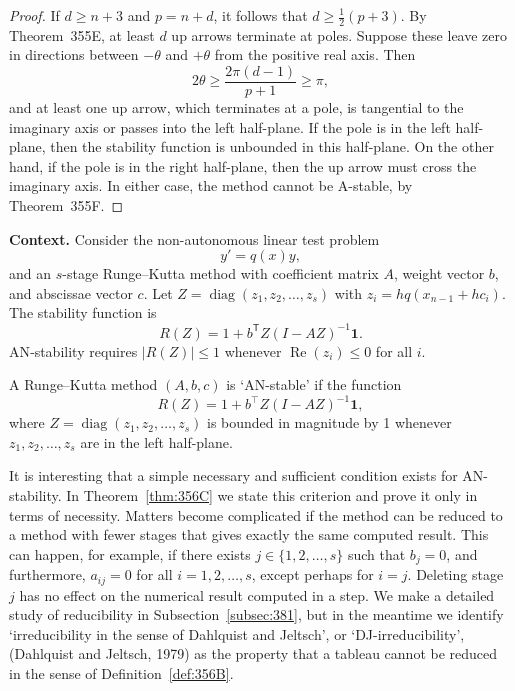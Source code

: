 \begin{proof}
If \( d \geq n + 3 \) and \( p = n + d \), it follows that \( d \geq \frac{1}{2}(p + 3) \). By Theorem~355E, at least \( d \) up arrows terminate at poles. Suppose these leave zero in directions between \( -\theta \) and \( +\theta \) from the positive real axis. Then
\[
2\theta \geq \frac{2\pi(d - 1)}{p + 1} \geq \pi,
\]
and at least one up arrow, which terminates at a pole, is tangential to the imaginary axis or passes into the left half-plane. If the pole is in the left half-plane, then the stability function is unbounded in this half-plane. On the other hand, if the pole is in the right half-plane, then the up arrow must cross the imaginary axis. In either case, the method cannot be A-stable, by Theorem~355F.
\end{proof}

\noindent\textbf{Context.}
Consider the non-autonomous linear test problem
\begin{equation}
    y' = q(x)y,
    \tag{356a}
\end{equation}
and an $s$-stage Runge--Kutta method with coefficient matrix $A$, weight vector $b$, and abscissae vector $c$.  
Let $Z = \operatorname{diag}(z_1, z_2, \dots, z_s)$ with $z_i = h q(x_{n-1} + h c_i)$.  
The stability function is
\[
R(Z) = 1 + b^{\mathsf T} Z (I - A Z)^{-1} \mathbf{1}.
\]
AN‑stability requires $|R(Z)| \le 1$ whenever $\operatorname{Re}(z_i) \le 0$ for all $i$.

\begin{definition}

  \label{def:356A}
A Runge--Kutta method $(A, b, c)$ is `AN-stable' if the function
\[
R(Z) = 1 + b^\top Z (I - AZ)^{-1} \mathbf{1},
\]
where $Z = \operatorname{diag}(z_1, z_2, \dots, z_s)$ is bounded in magnitude by 1 whenever $z_1, z_2, \dots, z_s$ are in the left half-plane.

It is interesting that a simple necessary and sufficient condition exists for AN-stability. In Theorem~\ref{thm:356C} we state this criterion and prove it only in terms of necessity. Matters become complicated if the method can be reduced to a method with fewer stages that gives exactly the same computed result. This can happen, for example, if there exists $j \in \{1, 2, \dots, s\}$ such that $b_j = 0$, and furthermore, $a_{ij} = 0$ for all $i = 1, 2, \dots, s$, except perhaps for $i = j$. Deleting stage $j$ has no effect on the numerical result computed in a step. We make a detailed study of reducibility in Subsection~\ref{subsec:381}, but in the meantime we identify `irreducibility in the sense of Dahlquist and Jeltsch', or `DJ-irreducibility', (Dahlquist and Jeltsch, 1979) as the property that a tableau cannot be reduced in the sense of Definition~\ref{def:356B}.
\end{definition}

